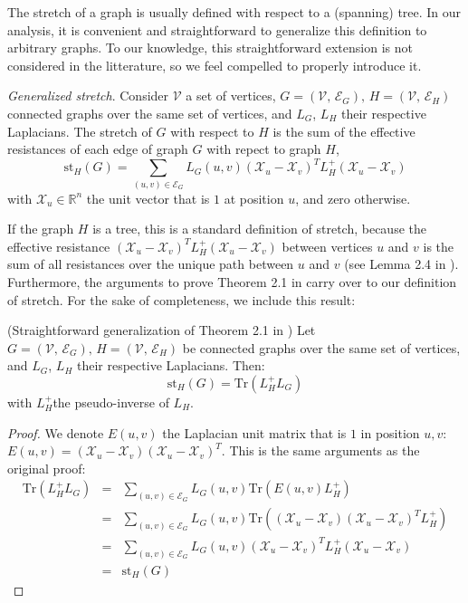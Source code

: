 The stretch of a graph is usually defined with respect to a (spanning)
tree. In our analysis, it is convenient and straightforward to generalize
this definition to arbitrary graphs. To our knowledge, this straightforward
extension is not considered in the litterature, so we feel compelled
to properly introduce it.
\begin{definition}
\emph{Generalized stretch}.\label{Generalized-stretch} Consider $\mathcal{V}$
a set of vertices, $G=\left(\mathcal{V},\,\mathcal{E}_{G}\right),\, H=\left(\mathcal{V},\,\mathcal{E}_{H}\right)$
connected graphs over the same set of vertices, and $L_{G}$, $L_{H}$
their respective Laplacians. The stretch of $G$ with respect to $H$
is the sum of the effective resistances of each edge of graph $G$
with repect to graph $H$, 
\[
\text{st}_{H}\left(G\right)=\sum_{\left(u,v\right)\in\mathcal{E}_{G}}L_{G}\left(u,v\right)\left(\mathcal{X}_{u}-\mathcal{X}_{v}\right)^{T}L_{H}^{+}\left(\mathcal{X}_{u}-\mathcal{X}_{v}\right)
\]
with $\mathcal{X}_{u}\in\mathbb{R}^{n}$ the unit vector that is $1$
at position $u$, and zero otherwise.
\end{definition}
If the graph $H$ is a tree, this is a standard definition of stretch,
because the effective resistance $\left(\mathcal{X}_{u}-\mathcal{X}_{v}\right)^{T}L_{H}^{+}\left(\mathcal{X}_{u}-\mathcal{X}_{v}\right)$
between vertices $u$ and $v$ is the sum of all resistances over
the unique path between $u$ and $v$ (see Lemma 2.4 in \cite{Spielman2009b}).
Furthermore, the arguments to prove Theorem 2.1 in \cite{Spielman2009b}
carry over to our definition of stretch. For the sake of completeness,
we include this result:
\begin{lemma}
\label{lem:stretch-trace}(Straightforward generalization of Theorem
2.1 in \cite{Spielman2009b}) Let $G=\left(\mathcal{V},\,\mathcal{E}_{G}\right),\, H=\left(\mathcal{V},\,\mathcal{E}_{H}\right)$
be connected graphs over the same set of vertices, and $L_{G}$, $L_{H}$
their respective Laplacians. Then: 
\[
\text{st}_{H}\left(G\right)=\text{Tr}\left(L_{H}^{+}L_{G}\right)
\]
with $L_{H}^{+}$the pseudo-inverse of $L_{H}$.\end{lemma}
\begin{proof}
We denote $E\left(u,v\right)$ the Laplacian unit matrix that is $1$
in position $u,v$: $E\left(u,v\right)=\left(\mathcal{X}_{u}-\mathcal{X}_{v}\right)\left(\mathcal{X}_{u}-\mathcal{X}_{v}\right)^{T}$.
This is the same arguments as the original proof: 
\begin{eqnarray*}
\text{Tr}\left(L_{H}^{+}L_{G}\right) & = & \sum_{\left(u,v\right)\in\mathcal{E}_{G}}L_{G}\left(u,v\right)\text{Tr}\left(E\left(u,v\right)L_{H}^{+}\right)\\
 & = & \sum_{\left(u,v\right)\in\mathcal{E}_{G}}L_{G}\left(u,v\right)\text{Tr}\left(\left(\mathcal{X}_{u}-\mathcal{X}_{v}\right)\left(\mathcal{X}_{u}-\mathcal{X}_{v}\right)^{T}L_{H}^{+}\right)\\
 & = & \sum_{\left(u,v\right)\in\mathcal{E}_{G}}L_{G}\left(u,v\right)\left(\mathcal{X}_{u}-\mathcal{X}_{v}\right)^{T}L_{H}^{+}\left(\mathcal{X}_{u}-\mathcal{X}_{v}\right)\\
 & = & \text{st}_{H}\left(G\right)
\end{eqnarray*}

\end{proof}
